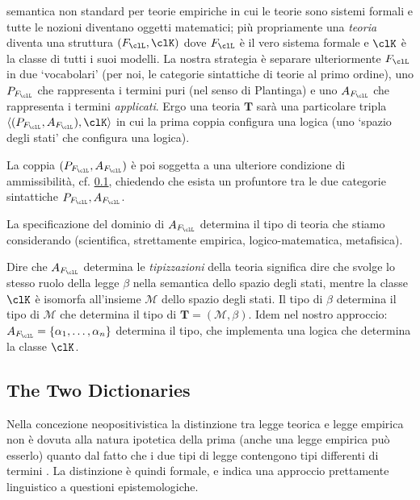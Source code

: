 \documentclass[a4paper]{../birkjour}
\newcommand{\bk}[1]{\langle #1\rangle}
\begin{document}
semantica non standard per teorie empiriche in cui le teorie sono sistemi formali e tutte le nozioni diventano oggetti matematici; più propriamente una \emph{teoria} diventa una struttura $(F_\clL, \clK)$ dove $F_\clL$ è il vero sistema formale e $\clK$ è la classe di tutti i suoi modelli. La nostra strategia è separare ulteriormente $F_\clL$ in due `vocabolari' (per noi, le categorie sintattiche di teorie al primo ordine), uno $P_{F_\clL}$ che rappresenta i termini puri (nel senso di Plantinga) e uno $A_{F_\clL}$ che rappresenta i termini \emph{applicati}. Ergo una teoria $\mathbf{T}$ sarà una particolare tripla $\bk{(P_{F_\clL},A_{F_\clL}), \clK}$ in cui la prima coppia configura una logica (uno `spazio degli stati' che configura una logica). 

La coppia $(P_{F_\clL},A_{F_\clL})$ è poi soggetta a una ulteriore condizione di ammissibilità, cf. \ref{}, chiedendo che esista un profuntore tra le due categorie sintattiche $P_{F_\clL},A_{F_\clL}$.

La specificazione del dominio di $A_{F_\clL}$ determina il tipo di teoria che stiamo considerando (scientifica, strettamente empirica, logico-matematica, metafisica).

Dire che $A_{F_\clL}$ determina le \emph{tipizzazioni} della teoria significa 
dire che svolge lo stesso ruolo della legge $\beta$ nella semantica dello spazio degli 
stati, mentre la classe $\clK$ è isomorfa all'insieme $\mathcal{M}$ dello spazio 
degli stati. Il tipo di $\beta$ determina il tipo di $\mathcal{M}$ che determina il 
tipo di $\mathbf{T} = (\mathcal{M}, \beta)$. Idem nel nostro approccio: $A_{F_\clL} 
= \{\alpha_1,\dots,\alpha_n\}$ determina il tipo, che implementa una logica che determina 
la classe $\clK$. 

\subsection{The Two Dictionaries}
Nella concezione neopositivistica la distinzione tra legge teorica e legge empirica non è dovuta alla natura ipotetica della prima (anche una legge empirica può esserlo) quanto dal fatto che i due tipi di legge contengono tipi differenti di termini \cite{}. La distinzione è quindi formale, e indica una approccio prettamente linguistico a questioni epistemologiche. 
\end{document}
